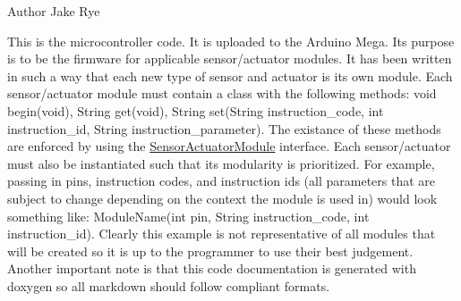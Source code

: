 \begin{DoxyAuthor}{Author}
Jake Rye
\end{DoxyAuthor}
This is the microcontroller code. It is uploaded to the Arduino Mega. It\textquotesingle{}s purpose is to be the firmware for applicable sensor/actuator modules. It has been written in such a way that each new type of sensor and actuator is its own module. Each sensor/actuator module must contain a class with the following methods\+: void begin(void), String get(void), String set(\+String instruction\+\_\+code, int instruction\+\_\+id, String instruction\+\_\+parameter). The existance of these methods are enforced by using the \hyperlink{class_sensor_actuator_module}{Sensor\+Actuator\+Module} interface. Each sensor/actuator must also be instantiated such that its modularity is prioritized. For example, passing in pins, instruction codes, and instruction ids (all parameters that are subject to change depending on the context the module is used in) would look something like\+: Module\+Name(int pin, String instruction\+\_\+code, int instruction\+\_\+id). Clearly this example is not representative of all modules that will be created so it is up to the programmer to use their best judgement. Another important note is that this code documentation is generated with doxygen so all markdown should follow compliant formats. 